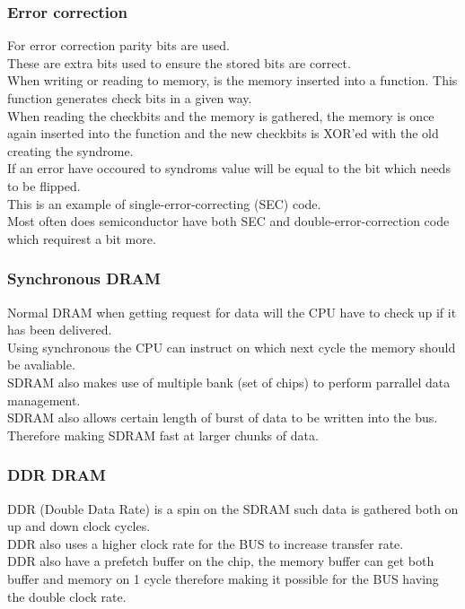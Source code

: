 \documentclass[12pt, a4paper]{article}
\begin{document}
			\subsubsection{Error correction}
				For error correction parity bits are used.\\
				These are extra bits used to ensure the stored bits are correct.\\
				When writing or reading to memory, is the memory inserted into a function. This function generates check bits in a given way.\\
				When reading the checkbits and the memory is gathered, the memory is once again inserted into the function and the new checkbits is XOR'ed with the old creating the syndrome.\\
				If an error have occoured to syndroms value will be equal to the bit which needs to be flipped.\\
				This is an example of single-error-correcting (SEC) code.\\
				Most often does semiconductor have both SEC and double-error-correction code which requirest a bit more.\\
			\subsubsection{Synchronous DRAM}
				Normal DRAM when getting request for data will the CPU have to check up if it has been delivered.\\
				Using synchronous the CPU can instruct on which next cycle the memory should be avaliable.\\
				SDRAM also makes use of multiple bank (set of chips) to perform parrallel data management.\\
				SDRAM also allows certain length of burst of data to be written into the bus. Therefore making SDRAM fast at larger chunks of data.\\
			\subsubsection{DDR DRAM}
				DDR (Double Data Rate) is a spin on the SDRAM such data is gathered both on up and down clock cycles.\\
				DDR also uses a higher clock rate for the BUS to increase transfer rate.\\
				DDR also have a prefetch buffer on the chip, the memory buffer can get both buffer and memory on 1 cycle therefore making it possible for the BUS having the double clock rate.\\
\end{document}
